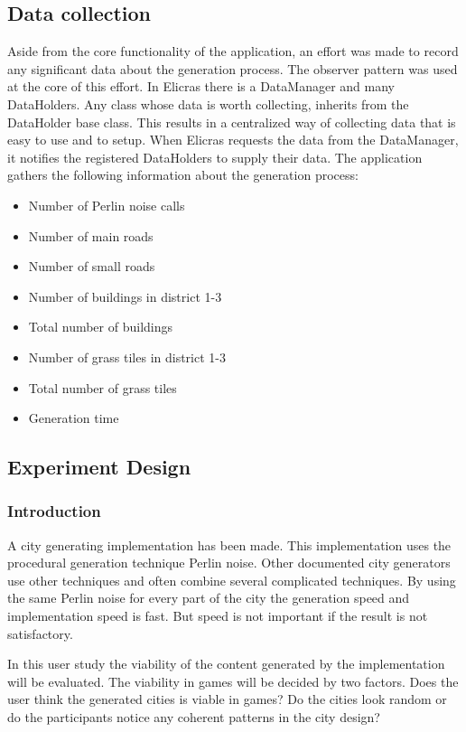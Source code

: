 	\subsection{Data collection}
	Aside from the core functionality of the application, an effort was made to record any significant data about the generation process. The observer pattern was used at the core of this effort. In Elicras there is a DataManager and many DataHolders. Any class whose data is worth collecting, inherits from the DataHolder base class. This results in a centralized way of collecting data that is easy to use and to setup. When Elicras requests the data from the DataManager, it notifies the registered DataHolders to supply their data. The application gathers the following information about the generation process:
		\begin{itemize}
			\item Number of Perlin noise calls
			\item Number of main roads
			\item Number of small roads
			\item Number of buildings in district 1-3
			\item Total number of buildings
			\item Number of grass tiles in district 1-3
			\item Total number of grass tiles
			\item Generation time
		\end{itemize}
	
	
	\subsection{Experiment Design}
		\subsubsection{Introduction}
		A city generating implementation has been made. This implementation uses the procedural generation technique Perlin noise. Other documented city generators use other techniques and often combine several complicated techniques. By using the same Perlin noise for every part of the city the generation speed and implementation speed is fast. But speed is not important if the result is not satisfactory.
		
			In this user study the viability of the content generated by the implementation will be evaluated.  The viability in games will be decided by two factors. Does the user think the generated cities is viable in games? Do the cities look random or do the participants notice any coherent patterns in the city design?
			
